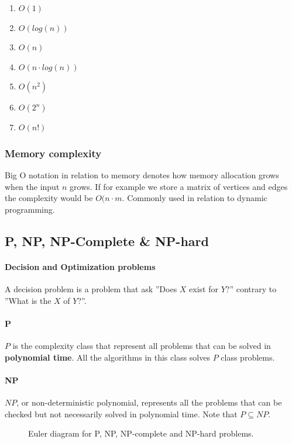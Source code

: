 \documentclass[12pt]{article} %
\begin{document}
\begin{enumerate}
    \item $O(1)$
    \item $O(log(n))$
    \item $O(n)$
    \item $O(n \cdot log(n))$
    \item $O(n^2)$
    \item $O(2^n)$
    \item $O(n!)$
\end{enumerate}

\subsubsection{Memory complexity}
Big O notation in relation to memory denotes how memory allocation grows when the input $n$ grows. If for example we store a matrix of vertices and edges the complexity would be $O(n \cdot m$. Commonly used in relation to dynamic programming.

\subsection{P, NP, NP-Complete \& NP-hard}

\paragraph{Decision and Optimization problems}
A decision problem is a problem that ask ''Does $X$ exist for $Y$?'' contrary to ''What is the $X$ of $Y$?''.

\paragraph{P}
$P$ is the complexity class that represent all problems that can be solved in \textbf{polynomial time}. All the algorithms in this class solves $P$ class problems.

\paragraph{NP}
$NP$, or non-deterministic polynomial, represents all the problems that can be checked but not necessarily solved in polynomial time. Note that $P \subseteq NP$.

\begin{figure}[H]
\caption{Euler diagram for P, NP, NP-complete and NP-hard problems.}
\label{npProblems}
\end{figure} 
\end{document}
